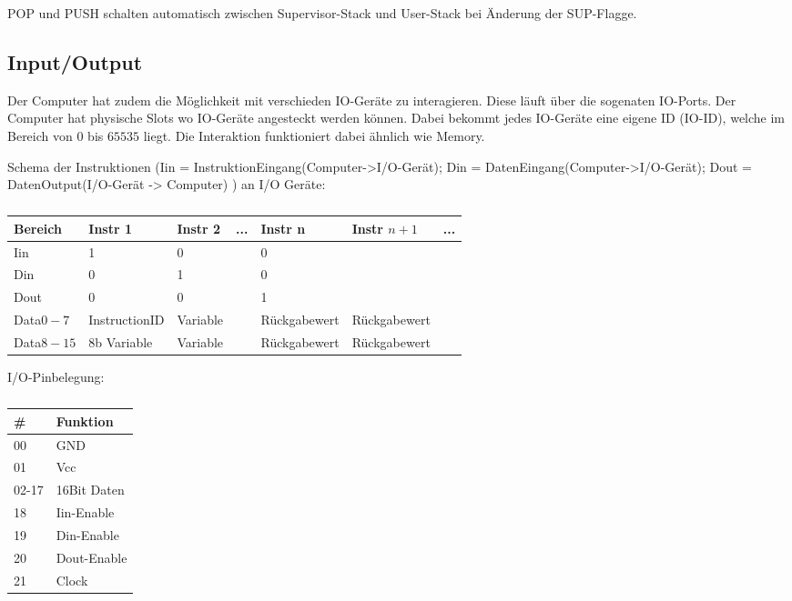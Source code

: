 \documentclass{scrartcl}
\begin{document}
POP und PUSH schalten automatisch zwischen Supervisor-Stack und User-Stack bei Änderung der SUP-Flagge.



\subsection{\label{section:io}Input/Output}

Der Computer hat zudem die Möglichkeit mit verschieden IO-Geräte zu interagieren. Diese läuft über die sogenaten IO-Ports.
Der Computer hat physische Slots wo IO-Geräte angesteckt werden können.
Dabei bekommt jedes IO-Geräte eine eigene ID (IO-ID), welche im Bereich von $0$ bis $65535$ liegt.
Die Interaktion funktioniert dabei ähnlich wie Memory.


Schema der Instruktionen (Iin = InstruktionEingang(Computer->I/O-Gerät); Din = DatenEingang(Computer->I/O-Gerät); Dout = DatenOutput(I/O-Gerät -> Computer) ) an I/O Geräte:

\begin{center}
	\begin{table}[h]
		\caption{\label{table:IO_Schem}}
		\begin{tabular}{l | l | l | l | l | l | l}
			 Bereich & Instr 1 & Instr 2 & ... & Instr n & Instr $n+1$ & ... \\
			\hline
			Iin & 1 & 0 &   & 0 & \\
			Din & 0 & 1 &   & 0 & \\
			Dout & 0 & 0 &   & 1 & \\
			Data$0-7$ & InstructionID & Variable &   & Rückgabewert & Rückgabewert \\
			Data$8-15$ & 8b Variable & Variable &   & Rückgabewert & Rückgabewert
 		\end{tabular}
	\end{table}
\end{center}


I/O-Pinbelegung:
\begin{center}
	\begin{table}[h]
		\caption{\label{table:IOPins}}
		\begin{tabular}{l | l}
			\# & Funktion \\
			\hline
			00 & GND \\
			01 & Vcc \\
			02-17 & 16Bit Daten \\
			18 & Iin-Enable \\
			19 & Din-Enable \\
			20 & Dout-Enable \\
			21 & Clock
 		\end{tabular}
	\end{table}
\end{center}
\end{document}
